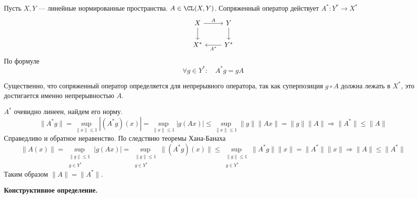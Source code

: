\begin{definition}
	Пусть $X,Y$ --- линейные нормированные пространства. $A \in \CL(X,Y)$. Сопряженный оператор действует $A^*\colon Y^* \to X^*$
\[\begin{tikzcd}[ampersand replacement=\&]
	X \& Y \\
	{X^*} \& {Y^*}
	\arrow["A", from=1-1, to=1-2]
	\arrow[from=1-1, to=2-1]
	\arrow[from=1-2, to=2-2]
	\arrow["{A^*}", from=2-2, to=2-1]
\end{tikzcd}\]
По формуле $$\forall g \in Y^*:  \quad A^*g = gA$$
\end{definition}
\begin{remark}
	Существенно, что сопряженный оператор определяется для непрерывного оператора, так как суперпозиция $g \circ A$ должна лежать в $X^*$, это достигается именно непрерывностью $A$.
\end{remark}
$A^*$ очевидно линеен, найдем его норму.
$$
\|A^*g\| = \sup\limits_{\|x\| \leq 1} |(A^*g)(x)|= \sup\limits_{\|x\| \leq 1}|g(Ax)|  \leq \sup\limits_{\|x\| \leq 1}\|g\|\|Ax\| = \|g\| \|A\| \Rightarrow \|A^*\| \leq \|A\|
$$
Справедливо и обратное неравенство. По следствию теоремы Хана-Банаха
$$
\|A(x)\| = \sup\limits_{\substack{\|g\| \leq 1 \\ g \in Y^* }} |g(Ax)| = \sup\limits_{\substack{\|g\| \leq 1 \\ g \in Y^* }} \|(A^*g)(x)\| \leq  \sup\limits_{\substack{\|g\| \leq 1 \\ g \in Y^* }} \|A^*g\|\|x\| = \|A^*\| \|x\| \Rightarrow \|A\| \leq \|A^*\| 
$$
Таким образом $\|A\| = \|A^*\|$. 

\noindent \textbf{Конструктивное определение.}

